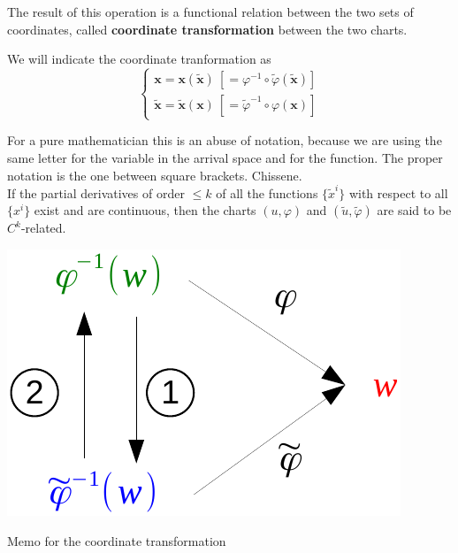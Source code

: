 \documentclass[../main.tex]{subfiles}
\begin{document}
The result of this operation is a functional relation between the two sets of coordinates,
called \textbf{coordinate transformation} between the two charts.
\begin{kaobox}[frametitle=Notation]
We will indicate the coordinate tranformation as
\begin{equation}\label{eq:coord-trans}
\begin{cases}
\mathbf{x}=\mathbf{x}(\tilde{\mathbf{x}})\ \left[=\varphi^{-1}\circ\tilde{\varphi}(\tilde{\mathbf{x}})\right]\\
\tilde{\mathbf{x}}=\tilde{\mathbf{x}}(\mathbf{x})\ \left[=\tilde{\varphi}^{-1}\circ\varphi(\mathbf{x})\right]
\end{cases}
\end{equation}
\end{kaobox}
For a pure mathematician this is an abuse of notation, because we are using the same letter for the variable in the arrival space and for the function. The proper notation is the one between square brackets. Chissene.\\
If the partial derivatives of order $\leq k$ of all the functions $\{\tilde{x}^i\}$ with respect to all $\{x^i\}$ exist and are continuous, then the charts $(u,\varphi)$ and $(\tilde{u},\tilde{\varphi})$ are said to be $C^k$-related.
\begin{marginfigure}
	\includegraphics{images/memo_trasf.pdf}
	\caption[Memo coordinate transformation]{Memo for the coordinate transformation}
\end{marginfigure} 
\end{document}
